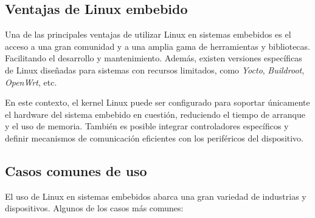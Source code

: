 \documentclass[12pt, letterpaper]{article}
\begin{document}
	\subsection{Ventajas de Linux embebido}

	Una de las principales ventajas de utilizar Linux en sistemas embebidos es el acceso a una gran comunidad y a una amplia gama de herramientas y bibliotecas. Facilitando el desarrollo y mantenimiento. Además, existen versiones específicas de Linux diseñadas para sistemas con recursos limitados, como \textit{Yocto}, \textit{Buildroot}, \textit{OpenWrt}, etc.

	En este contexto, el kernel Linux puede ser configurado para soportar únicamente el hardware del sistema embebido en cuestión, reduciendo el tiempo de arranque y el uso de memoria. También es posible integrar controladores específicos y definir mecanismos de comunicación eficientes con los periféricos del dispositivo.

	\subsection{Casos comunes de uso}

	El uso de Linux en sistemas embebidos abarca una gran variedad de industrias y dispositivos. Algunos de los casos más comunes:
\end{document}
